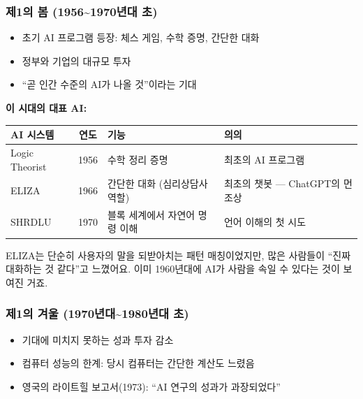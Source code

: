 \documentclass[11pt,a4paper]{article}
\renewcommand{\arraystretch}{1.4}
\begin{document}
\subsubsection{ 제1의 봄 (1956\textasciitilde 1970년대 초)}

\begin{itemize}[leftmargin=*]
    \item 초기 AI 프로그램 등장: 체스 게임, 수학 증명, 간단한 대화
    \item 정부와 기업의 대규모 투자
    \item ``곧 인간 수준의 AI가 나올 것''이라는 기대
\end{itemize}

\textbf{이 시대의 대표 AI:}

\begin{center}
\renewcommand{\arraystretch}{1.4}
\begin{tabular}{|l|c|p{4cm}|p{4.5cm}|}
\hline
\rowcolor{tableheader}
\textbf{AI 시스템} & \textbf{연도} & \textbf{기능} & \textbf{의의} \\
\hline
Logic Theorist & 1956 & 수학 정리 증명 & 최초의 AI 프로그램 \\
\hline
ELIZA & 1966 & 간단한 대화 (심리상담사 역할) & 최초의 챗봇 — ChatGPT의 먼 조상 \\
\hline
SHRDLU & 1970 & 블록 세계에서 자연어 명령 이해 & 언어 이해의 첫 시도 \\
\hline
\end{tabular}
\end{center}

\begin{tipbox}
ELIZA는 단순히 사용자의 말을 되받아치는 패턴 매칭이었지만, 많은 사람들이 ``진짜 대화하는 것 같다''고 느꼈어요. 이미 1960년대에 AI가 사람을 속일 수 있다는 것이 보여진 거죠.
\end{tipbox}

\subsubsection{ 제1의 겨울 (1970년대\textasciitilde 1980년대 초)}

\begin{itemize}[leftmargin=*]
    \item 기대에 미치지 못하는 성과  투자 감소
    \item 컴퓨터 성능의 한계: 당시 컴퓨터는 간단한 계산도 느렸음
    \item 영국의 라이트힐 보고서(1973): ``AI 연구의 성과가 과장되었다''
\end{itemize}
\end{document}
